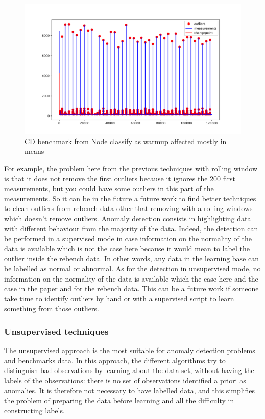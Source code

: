 \documentclass{article}
\begin{document}
\begin{figure}[h!]
    \centering
    \includegraphics[width=1\textwidth]{images/plot_13_flat.png}
    \caption{CD benchmark from Node classify as warmup affected mostly in means}
    \label{fig:bench_node_flat}
\end{figure}

For example, the problem here from the previous techniques with rolling window is that it does not remove the first outliers because it ignores the 200 first measurements, but you could have some outliers in this part of the measurements. So it can be in the future a future work to find better techniques to clean outliers from rebench data other that removing with a rolling windows which doesn't remove outliers.
Anomaly detection consists in highlighting data with different behaviour from the majority of the data. 
Indeed, the detection can be performed in a supervised mode in case information on the normality of the data is available which is not the case here because it would mean to label the outlier inside the rebench data. In other words, any data in the learning base can be labelled as normal or abnormal.
As for the detection in unsupervised mode, no information on the normality of the data is available which the case here and the case in the \citep{barrett2017virtual} paper and for the rebench data. This can be a future work if someone take time to identify outliers by hand or with a supervised script to learn something from those outliers.

\subsubsection{Unsupervised techniques}
The unsupervised approach is the most suitable for anomaly detection problems and benchmarks data. In this approach, the different algorithms try to distinguish bad observations by learning about the data set, without having the labels of the observations: there is no set of observations identified a priori as anomalies. It is therefore not necessary to have labelled data, and this simplifies the problem of preparing the data before learning and all the difficulty in constructing labels.
\end{document}
